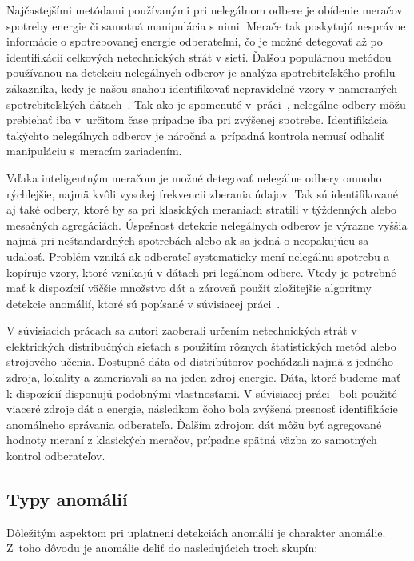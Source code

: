 \documentclass[a4paper,twoside,slovak,12pt]{article}
\begin{document}
Najčastejšími metódami používanými pri nelegálnom odbere je obídenie meračov
spotreby energie či samotná manipulácia s nimi. Merače tak poskytujú nesprávne
informácie o spotrebovanej energie odberateľmi, čo je možné detegovať až po
identifikácií celkových netechnických strát v sieti. Ďalšou populárnou metódou
používanou na detekciu nelegálnych odberov je analýza spotrebiteľského
profilu zákazníka, kedy je našou snahou identifikovať nepravidelné vzory
v nameraných spotrebiteľských dátach~\cite{Sahoo2015}. Tak ako je spomenuté
v~práci~\cite{Depuru2012}, nelegálne odbery môžu prebiehať iba v~určitom čase
prípadne iba pri zvýšenej spotrebe. Identifikácia takýchto nelegálnych odberov
je náročná a~prípadná kontrola nemusí odhaliť manipuláciu s~meracím zariadením.

Vďaka inteligentným meračom je možné detegovať nelegálne odbery omnoho
rýchlejšie, najmä kvôli vysokej frekvencii zberania údajov. Tak sú
identifikované aj také odbery, ktoré by sa pri klasických meraniach stratili
v týždenných alebo mesačných agregáciách. Úspešnosť detekcie nelegálnych odberov
je výrazne vyššia najmä pri neštandardných spotrebách alebo ak sa jedná
o neopakujúcu sa udalosť. Problém vzniká ak odberateľ systematicky mení
nelegálnu spotrebu a kopíruje vzory, ktoré vznikajú v dátach pri legálnom
odbere. Vtedy je potrebné mať k dispozícií väčšie množstvo dát a zároveň použiť
zložitejšie algoritmy detekcie anomálií, ktoré sú popísané v súvisiacej
práci~\cite{Nikovski2013}.

V súvisiacich prácach sa autori zaoberali určením netechnických strát
v elektrických distribučných sieťach s použitím rôznych štatistických metód
alebo strojového učenia. Dostupné dáta od distribútorov pochádzali najmä z
jedného zdroja, lokality a zameriavali sa na jeden zdroj energie. Dáta, ktoré
budeme mať k dispozícií disponujú podobnými vlastnosťami. V súvisiacej
práci~\cite{Coma-Puig2016} boli použité viaceré zdroje dát a energie, následkom
čoho bola zvýšená presnosť identifikácie anomálneho správania odberateľa.
Ďalším zdrojom dát môžu byť agregované hodnoty meraní z klasických meračov,
prípadne spätná väzba zo samotných kontrol odberateľov.

\subsection{Typy anomálií}
Dôležitým aspektom pri uplatnení detekciách anomálií je charakter anomálie.
Z~toho dôvodu je anomálie deliť do nasledujúcich troch skupín:
\end{document}
